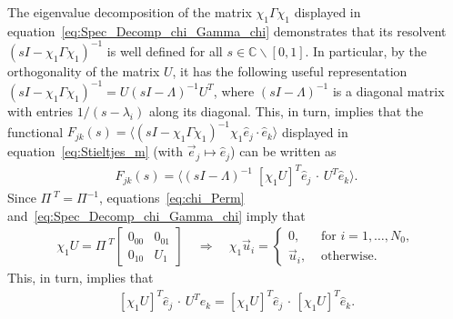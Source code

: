 \documentclass{cmslatex}
\begin{document}
The eigenvalue decomposition of the matrix $\chi_1\Gamma\chi_1$ displayed in
equation~\eqref{eq:Spec_Decomp_chi_Gamma_chi} demonstrates that its
resolvent $(sI-\chi_1\Gamma\chi_1)^{-1}$ is well defined for all
$s\in\mathbb{C}\backslash[0,1]$. In particular, by the orthogonality of the
matrix $U$, it has the following useful representation
$(sI-\chi_1\Gamma\chi_1)^{-1}=U(sI-\Lambda)^{-1}U^T$, where $(sI-\Lambda)^{-1}$ is a diagonal
matrix with entries $1/(s-\lambda_i)$ along its diagonal. This, in
turn, implies that the functional
$F_{jk}(s)=\langle(sI-\chi_1\Gamma\chi_1)^{-1}\chi_1\hat{e}_j\cdot\hat{e}_k\rangle$ 
displayed in equation~\eqref{eq:Stieltjes_m} (with
$\vec{e}_j\mapsto\hat{e}_j$) can be written as     
%
\begin{align}\label{eq:Matrix_Functional_proof}
  F_{jk}(s)%
          =\langle(sI-\Lambda)^{-1}\;[\chi_1U]^T\hat{e}_j\,\cdot\,U^T\hat{e}_k\rangle. 
\end{align}
%
Since
$\Pi^{\;T}=\Pi^{-1}$, equations~\eqref{eq:chi_Perm}
and~\eqref{eq:Spec_Decomp_chi_Gamma_chi} imply that 
%
\begin{align}\label{eq:Projection_Eigenspace}
  \chi_1U=\Pi^{\;T}\left[
  \begin{array}{ccc}
    0_{00}&0_{01}\\
    0_{10}&U_1  
    \end{array}
\right]
\quad
\Longrightarrow
\quad
\chi_1\vec{u}_i=
  \begin{cases}
  0, &\text{~for~} i=1,\ldots,N_0,  \\
  \vec{u}_i,  &\text{~otherwise}.
\end{cases}
\end{align}
%
This, in turn, implies that
%
\begin{align}\label{eq:Weights_chi}
  [\chi_1U]^T\hat{e}_j\,\cdot\,U^T\hat{e}_k=[\chi_1U]^T\hat{e}_j\,\cdot\,[\chi_1U]^T\hat{e}_k.
\end{align}
%
\end{document}

